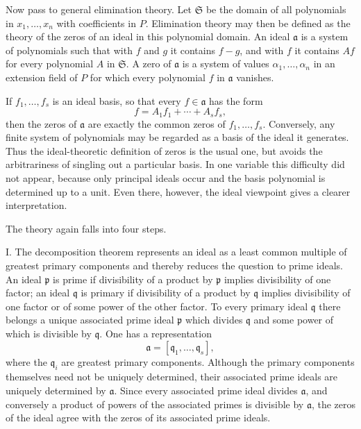 \documentclass[12pt]{article}
\begin{document}
Now pass to general elimination theory. Let $\mathfrak S$ be the domain of all polynomials in $x_1,\ldots,x_n$ with coefficients in $P$. Elimination theory may then be defined as the theory of the zeros of an ideal in this polynomial domain. An ideal $\mathfrak a$ is a system of polynomials such that with $f$ and $g$ it contains $f-g$, and with $f$ it contains $Af$ for every polynomial $A$ in $\mathfrak S$. A zero of $\mathfrak a$ is a system of values $\alpha_1,\ldots,\alpha_n$ in an extension field of $P$ for which every polynomial $f$ in $\mathfrak a$ vanishes.

If $f_1,\ldots,f_s$ is an ideal basis, so that every $f\in\mathfrak a$ has the form
\[
  f=A_1f_1+\cdots+A_sf_s,
\]
then the zeros of $\mathfrak a$ are exactly the common zeros of $f_1,\ldots,f_s$. Conversely, any finite system of polynomials may be regarded as a basis of the ideal it generates. Thus the ideal-theoretic definition of zeros is the usual one, but avoids the arbitrariness of singling out a particular basis. In one variable this difficulty did not appear, because only principal ideals occur and the basis polynomial is determined up to a unit. Even there, however, the ideal viewpoint gives a clearer interpretation.

The theory again falls into four steps.

I. The decomposition theorem represents an ideal as a least common multiple of greatest primary components and thereby reduces the question to prime ideals. An ideal $\mathfrak p$ is prime if divisibility of a product by $\mathfrak p$ implies divisibility of one factor; an ideal $\mathfrak q$ is primary if divisibility of a product by $\mathfrak q$ implies divisibility of one factor or of some power of the other factor. To every primary ideal $\mathfrak q$ there belongs a unique associated prime ideal $\mathfrak p$ which divides $\mathfrak q$ and some power of which is divisible by $\mathfrak q$. One has a representation
\[
  \mathfrak a=[\mathfrak q_1,\ldots,\mathfrak q_s],
\]
where the $\mathfrak q_i$ are greatest primary components. Although the primary components themselves need not be uniquely determined, their associated prime ideals are uniquely determined by $\mathfrak a$. Since every associated prime ideal divides $\mathfrak a$, and conversely a product of powers of the associated primes is divisible by $\mathfrak a$, the zeros of the ideal agree with the zeros of its associated prime ideals.
\end{document}
